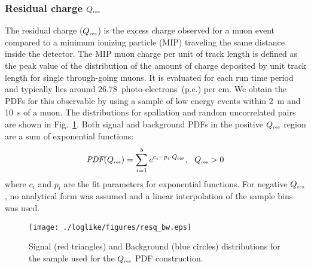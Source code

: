 \subsubsection{Residual charge $Q_{\mbox{\tiny res}}$}
The residual charge ($Q_{\mbox{\tiny res}}$) is the excess charge observed for a muon event compared to a minimum ionizing particle (MIP) traveling the same distance inside the detector. The MIP muon charge per unit of track length is defined as the peak value of the distribution of the amount of charge deposited by unit track length for single through-going muons. It is evaluated for each run time period and typically lies around $26.78$~photo-electrons~(p.e.) per cm. We obtain the PDFs for this observable by using a sample of low energy events within 2~m and 10~s of a muon. The distributions for spallation and random uncorrelated pairs are shown in Fig.~\ref{fig:qres}. Both signal and background PDFs in the positive $Q_{\mbox{\tiny res}}$ region are a sum of exponential functions:
\begin{equation}
\mbox{\it PDF}(Q_{\mbox{\tiny res}}) =\sum^5_{i=1} e^{c_i - p_i\cdot Q_{\mbox{\tiny res}}}, \ \ Q_{\mbox{\tiny res}} > 0
\end{equation}
where $c_i$ and $p_i$ are the fit parameters for exponential functions. For negative $Q_{\mbox{\tiny res}}$, no analytical form was assumed and a linear interpolation of the sample bins was used. 

\begin{figure}
    \centering
    \texttt{[image: ./loglike/figures/resq\_bw.eps]}
    \caption{Signal (red triangles) and Background (blue circles) distributions for the sample used for the $Q_{\mbox{\tiny res}}$ PDF construction.}
    \label{fig:qres}
\end{figure}

